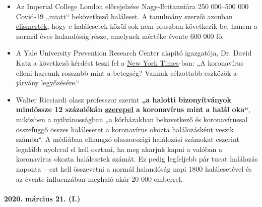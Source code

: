 \begin{itemize}
\tightlist
\item
  Az Imperial College London előrejelzése Nagy-Britanniára 250 000--500
  000 Covid-19 „miatt`` bekövetkező haláleset. A tanulmány szerzői
  azonban \href{https://www.bbc.com/news/health-51979654}{elismerték},
  hogy e halálesetek közül sok nem pluszban következik be, hanem a
  normál éves halandóság része, amelynek mértéke évente 600 000 fő.
\item
  A Yale University Prevention Research Center alapító igazgatója, Dr.
  David Katz a következő kérdést teszi fel a
  \href{https://www.nytimes.com/2020/03/20/opinion/coronavirus-pandemic-social-distancing.html}{New
  York Times}-ban: „A koronavírus elleni harcunk rosszabb mint a
  betegség? Vannak célzottabb eszközök a járvány legyőzésére.``
\item
  Walter Ricciardi olasz professzor szerint \textbf{„a halotti
  bizonyítványok mindössze 12 százalékán
  \href{https://web.archive.org/web/20200324214448/https://www.telegraph.co.uk/global-health/science-and-disease/have-many-coronavirus-patients-died-italy/}{szerepel}
  a koronavírus mint a halál oka``}, miközben a nyilvánosságban „a
  kórházakban bekövetkező és koronavírussal összefüggő összes
  halálesetet a koronavírus okozta halálozásként veszik számba``. A
  médiában elhangzó olaszországi halálozási számokat eszerint legalább
  nyolccal el kell osztani, ha meg akarjuk kapni a valóban a koronavírus
  okozta halálesetek számát. Ez pedig legfeljebb pár tucat halálozás
  naponta -- ezt kell összevetni a normál halandóság napi 1800
  halálesetével és az évente influenzában meghaló akár 20 000 emberrel.
\end{itemize}

\hypertarget{2020-muxe1rcius-21-i}{%
\paragraph{2020. március 21. (I.)}\label{2020-muxe1rcius-21-i}}

